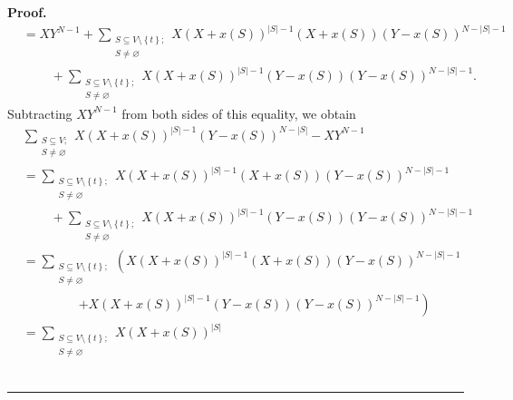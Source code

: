 \documentclass[numbers=enddot,12pt,final,onecolumn,notitlepage]{scrartcl}%
\theoremstyle{definition}
\newenvironment{proof}[1][Proof]{\noindent\textbf{#1.} }{\ \rule{0.5em}{0.5em}}
\let\sumnonlimits\sum
\renewcommand{\sum}{\sumnonlimits\limits}
\newenvironment{verlong}{}{}
\begin{document}
\begin{verlong}
\begin{proof}
\begin{align*}
&  =XY^{N-1}+\sum_{\substack{S\subseteq V\setminus\left\{  t\right\}
;\\S\neq\varnothing}}X\left(  X+x\left(  S\right)  \right)  ^{\left\vert
S\right\vert -1}\left(  X+x\left(  S\right)  \right)  \left(  Y-x\left(
S\right)  \right)  ^{N-\left\vert S\right\vert -1}\\
&  \ \ \ \ \ \ \ \ \ \ +\sum_{\substack{S\subseteq V\setminus\left\{
t\right\}  ;\\S\neq\varnothing}}X\left(  X+x\left(  S\right)  \right)
^{\left\vert S\right\vert -1}\left(  Y-x\left(  S\right)  \right)  \left(
Y-x\left(  S\right)  \right)  ^{N-\left\vert S\right\vert -1}.
\end{align*}
Subtracting $XY^{N-1}$ from both sides of this equality, we obtain%
\begin{align*}
&  \sum_{\substack{S\subseteq V;\\S\neq\varnothing}}X\left(  X+x\left(
S\right)  \right)  ^{\left\vert S\right\vert -1}\left(  Y-x\left(  S\right)
\right)  ^{N-\left\vert S\right\vert }-XY^{N-1}\\
&  =\sum_{\substack{S\subseteq V\setminus\left\{  t\right\}  ;\\S\neq
\varnothing}}X\left(  X+x\left(  S\right)  \right)  ^{\left\vert S\right\vert
-1}\left(  X+x\left(  S\right)  \right)  \left(  Y-x\left(  S\right)  \right)
^{N-\left\vert S\right\vert -1}\\
&  \ \ \ \ \ \ \ \ \ \ +\sum_{\substack{S\subseteq V\setminus\left\{
t\right\}  ;\\S\neq\varnothing}}X\left(  X+x\left(  S\right)  \right)
^{\left\vert S\right\vert -1}\left(  Y-x\left(  S\right)  \right)  \left(
Y-x\left(  S\right)  \right)  ^{N-\left\vert S\right\vert -1}\\
&  =\sum_{\substack{S\subseteq V\setminus\left\{  t\right\}  ;\\S\neq
\varnothing}}\left(  X\left(  X+x\left(  S\right)  \right)  ^{\left\vert
S\right\vert -1}\left(  X+x\left(  S\right)  \right)  \left(  Y-x\left(
S\right)  \right)  ^{N-\left\vert S\right\vert -1}\right. \\
&  \ \ \ \ \ \ \ \ \ \ \ \ \ \ \ \ \ \ \ \ \left.  +X\left(  X+x\left(
S\right)  \right)  ^{\left\vert S\right\vert -1}\left(  Y-x\left(  S\right)
\right)  \left(  Y-x\left(  S\right)  \right)  ^{N-\left\vert S\right\vert
-1}\right) \\
&  =\sum_{\substack{S\subseteq V\setminus\left\{  t\right\}  ;\\S\neq
\varnothing}}X\left(  X+x\left(  S\right)  \right)  ^{\left\vert S\right\vert
}
\end{align*}
\end{proof}
\end{verlong}
\end{document}
